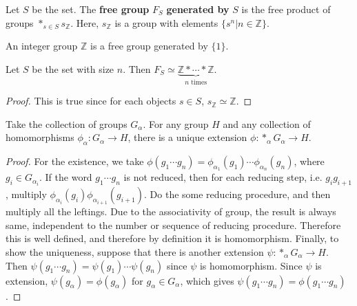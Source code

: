 \begin{defn} Let $S$ be the set. The \textbf{free group} $F_S$ \textbf{generated by} $S$ is the free product of groups $*_{s\in S}s_{\mathbb{Z}}$. Here, $s_{\mathbb{Z}}$ is a group with elements $\{s^n|n\in \mathbb{Z}\}$.
\end{defn}

\begin{exmp} An integer group $\mathbb{Z}$ is a free group generated by $\{1\}$.
\end{exmp}

\begin{prop} Let $S$ be the set with size $n$. Then $F_S\simeq \underbrace{\mathbb{Z}*\cdots*\mathbb{Z}}_{n\textrm{ times}}$.
\end{prop}
\begin{proof} This is true since for each objects $s\in S$, $s_{\mathbb{Z}}\simeq \mathbb{Z}$.
\end{proof}

\begin{thm} Take the collection of groups $G_\alpha$. For any group $H$ and any collection of homomorphisms $\phi_\alpha:G_\alpha\rightarrow H$, there is a unique extension $\phi:*_\alpha G_\alpha\rightarrow H$.
\end{thm}
\begin{proof}
For the existence, we take $\phi(g_1\cdots g_n)=\phi_{\alpha_1}(g_1)\cdots \phi_{\alpha_n}(g_n)$, where $g_i\in G_{\alpha_i}$. If the word $g_1\cdots g_n$ is not reduced, then for each reducing step, i.e. $g_ig_{i+1}$, multiply $\phi_{\alpha_i}(g_i)\phi_{\alpha_{i+1}}(g_{i+1})$. Do the some reducing procedure, and then multiply all the leftings. Due to the associativity of group, the result is always same, independent to the number or sequence of reducing procedure. Therefore this is well defined, and therefore by definition it is homomorphism. Finally, to show the uniqueness, suppose that there is another extension $\psi:*_\alpha G_\alpha\rightarrow H$. Then $\psi(g_1\cdots g_n)=\psi(g_1)\cdots \psi(g_n)$ since $\psi$ is homomorphism. Since $\psi$ is extension, $\psi(g_\alpha)=\phi(g_\alpha)$ for $g_\alpha\in G_{\alpha}$, which gives $\psi(g_1\cdots g_n)=\phi(g_1\cdots g_n)$.
\end{proof}

